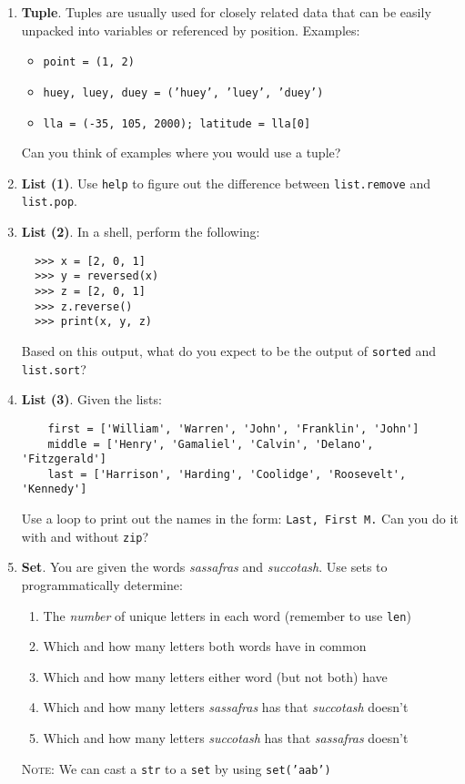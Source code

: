 \documentclass{article}
\begin{document}
  
  \begin{enumerate}
  \item \textbf{Tuple}. Tuples are usually used for closely related
  data that can be easily unpacked into variables or referenced by
  position. Examples:
  \begin{itemize}
    \item \texttt{point = (1, 2)}
    \item \texttt{huey, luey, duey = ('huey', 'luey', 'duey')}
    \item \texttt{lla = (-35, 105, 2000); latitude = lla[0]}
  \end{itemize}
  Can you think of examples where you would use a tuple?

  \item \textbf{List (1)}. Use \texttt{help} to figure out the difference between
  \texttt{list.remove} and \texttt{list.pop}.

  \item \textbf{List (2)}. In a shell, perform the following:
  \begin{lstlisting}
  >>> x = [2, 0, 1]
  >>> y = reversed(x)
  >>> z = [2, 0, 1]
  >>> z.reverse()
  >>> print(x, y, z)
  \end{lstlisting}
  Based on this output, what do you expect to be the output of \texttt{sorted}
  and \texttt{list.sort}?

  \item \textbf{List (3)}. Given the lists:
  \begin{lstlisting}
    first = ['William', 'Warren', 'John', 'Franklin', 'John']
    middle = ['Henry', 'Gamaliel', 'Calvin', 'Delano', 'Fitzgerald']
    last = ['Harrison', 'Harding', 'Coolidge', 'Roosevelt', 'Kennedy']
  \end{lstlisting}
  Use a loop to print out the names in the form: \texttt{Last, First M.}
  Can you do it with and without \texttt{zip}? 

  \item \textbf{Set}. You are given the words \textit{sassafras}
  and \textit{succotash}. Use sets to programmatically determine:
  \begin{enumerate}
    \item The \textit{number} of unique letters in each word (remember to use \texttt{len})
    \item Which and how many letters both words have in common 
    \item Which and how many letters either word (but not both) have
    \item Which and how many letters \textit{sassafras} has that \textit{succotash} doesn't
    \item Which and how many letters \textit{succotash} has that \textit{sassafras} doesn't
  \end{enumerate}
  \textsc{Note}: We can cast a \texttt{str} to a \texttt{set} by using \texttt{set('aab')}


\end{enumerate}
\end{document}
